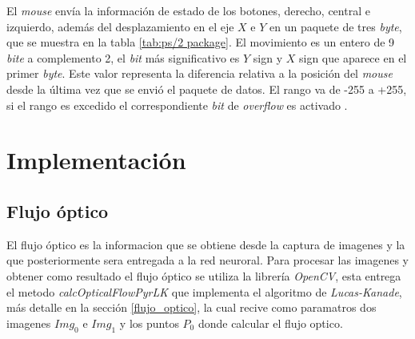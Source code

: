 \documentclass{iccmemoria}
\begin{document}
El \emph{mouse} envía la información de estado de los botones, derecho, central e izquierdo, además del desplazamiento en el eje $X$ e $Y$ en un paquete de tres \emph{byte}, que se muestra en la tabla \ref{tab:ps/2 package}. El movimiento es un entero de 9 \emph{bite} a complemento 2, el \emph{bit} más significativo es $Y$ sign y $X$ sign que aparece en el primer \emph{byte}. Este valor representa la diferencia relativa a la posición del \emph{mouse} desde la última vez que se envió el paquete de datos. El rango va de -255 a +255, si el rango es excedido el correspondiente \emph{bit} de \emph{overflow} es activado \cite{ps2mouse}.\\

\begin{table}[H]
\caption{Paquete de datos del moviento del \emph{mouse}.}
\label{tab:ps/2 package}
\end{table}



\chapter{Implementación}

\section{Flujo óptico}

El flujo óptico es la informacion que se obtiene desde la captura de imagenes y la que posteriormente sera entregada a la red neuroral. Para procesar las imagenes y obtener como resultado el flujo óptico se utiliza la librería \emph{OpenCV}, esta entrega el metodo \emph{calcOpticalFlowPyrLK} que implementa el algoritmo de \emph{Lucas-Kanade}, más detalle en la sección \ref{flujo_optico}, la cual recive como paramatros dos imagenes $Img_0$ e $Img_1$ y los puntos $P_0$ donde calcular el flujo optico.\\
\end{document}

